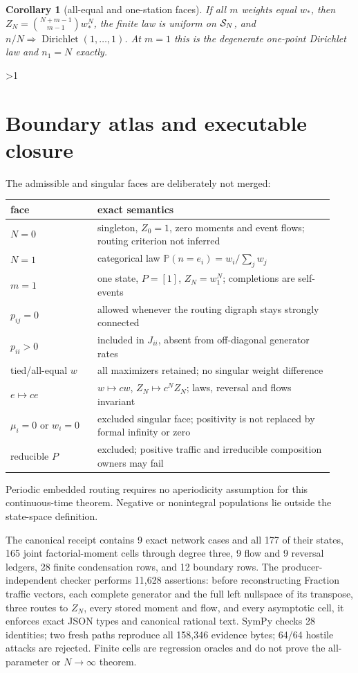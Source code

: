 \documentclass[10pt]{article}
\providecommand{\CRevisionRound}{2}
\newtheorem{corollary}{Corollary}
\newcommand{\Pp}{\mathbb P}
\newcommand{\Dir}{\operatorname{Dirichlet}}
\begin{document}
\begin{corollary}[all-equal and one-station faces]
If all $m$ weights equal $w_*$, then
$Z_N=\binom{N+m-1}{m-1}w_*^N$, the finite law is uniform on ${\cal S}_N$,
and $n/N\Rightarrow\Dir(1,\ldots,1)$.  At $m=1$ this is the degenerate
one-point Dirichlet law and $n_1=N$ exactly.
\end{corollary}
\fi

\ifnum\CRevisionRound>1
\section{Boundary atlas and executable closure}
The admissible and singular faces are deliberately not merged:
\begin{center}
\begin{tabular}{@{}p{0.25\linewidth}p{0.68\linewidth}@{}}
\toprule
face & exact semantics \\ \midrule
$N=0$ & singleton, $Z_0=1$, zero moments and event flows; routing criterion not inferred \\
$N=1$ & categorical law $\Pp(n=e_i)=w_i/\sum_jw_j$ \\
$m=1$ & one state, $P=[1]$, $Z_N=w_1^N$; completions are self-events \\
$p_{ij}=0$ & allowed whenever the routing digraph stays strongly connected \\
$p_{ii}>0$ & included in $J_{ii}$, absent from off-diagonal generator rates \\
tied/all-equal $w$ & all maximizers retained; no singular weight difference \\
$e\mapsto ce$ & $w\mapsto cw$, $Z_N\mapsto c^NZ_N$; laws, reversal and flows invariant \\
$\mu_i=0$ or $w_i=0$ & excluded singular face; positivity is not replaced by formal infinity or zero \\
reducible $P$ & excluded; positive traffic and irreducible composition owners may fail \\ \bottomrule
\end{tabular}
\end{center}
Periodic embedded routing requires no aperiodicity assumption for this
continuous-time theorem.  Negative or nonintegral populations lie outside
the state-space definition.

The canonical receipt contains 9 exact network cases and all 177 of their
states, 165 joint factorial-moment cells through degree three, 9 flow and 9
reversal ledgers, 28 finite condensation rows, and 12 boundary rows.  The
producer-independent checker performs 11,628 assertions: before reconstructing
Fraction traffic vectors, each complete generator and the full left
nullspace of its transpose, three routes to $Z_N$, every stored moment and
flow, and every asymptotic cell, it enforces exact JSON types and canonical
rational text.  SymPy checks 28 identities; two fresh paths reproduce all
158,346 evidence bytes; 64/64 hostile attacks are rejected.
Finite cells are regression oracles and do not prove the all-parameter or
$N\to\infty$ theorem.
\end{document}
